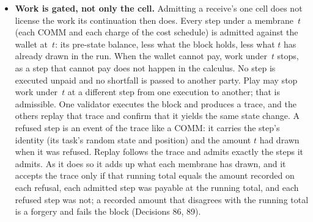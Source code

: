 \documentclass[11pt]{article}
\begin{document}
\begin{itemize}
\item \textbf{Work is gated, not only the cell.} Admitting a receive's one cell does not license the work its continuation then does. Every step under a membrane~$t$ (each COMM and each charge of the cost schedule) is admitted against the wallet at~$t$: its pre-state balance, less what the block holds, less what $t$ has already drawn in the run. When the wallet cannot pay, work under~$t$ stops, as a step that cannot pay does not happen in the calculus. No step is executed unpaid and no shortfall is passed to another party. Play may stop work under~$t$ at a different step from one execution to another; that is admissible. One validator executes the block and produces a trace, and the others replay that trace and confirm that it yields the same state change. A refused step is an event of the trace like a COMM: it carries the step's identity (its task's random state and position) and the amount $t$ had drawn when it was refused. Replay follows the trace and admits exactly the steps it admits. As it does so it adds up what each membrane has drawn, and it accepts the trace only if that running total equals the amount recorded on each refusal, each admitted step was payable at the running total, and each refused step was not; a recorded amount that disagrees with the running total is a forgery and fails the block (Decisions 86, 89).

\end{itemize}
\end{document}

